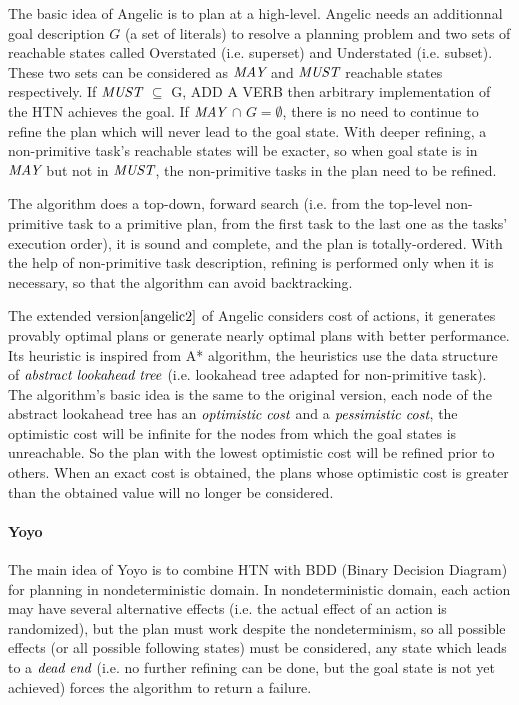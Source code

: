 The basic idea of Angelic \cite{angelic1} is to plan at a high-level. Angelic needs an additionnal goal description $G$ (a set of literals) to resolve a planning problem and two sets of reachable states called Overstated (i.e. superset) and Understated (i.e. subset). These two sets can be considered as $\emph{MAY}$ and $\emph{MUST}$ reachable states respectively. If $\emph{MUST}$ $\subseteq$ G, ADD A VERB then arbitrary implementation of the HTN achieves the goal. If $\emph{MAY}$ $\cap$ $G = \emptyset$, there is no need to continue to refine the plan which will never lead to the goal state. With deeper refining, a non-primitive task’s reachable states will be exacter, so when goal state is in $\emph{MAY}$ but not in $\emph{MUST}$, the non-primitive tasks in the plan need to be refined. 

The algorithm does a top-down, forward search (i.e. from the top-level non-primitive task to a primitive plan, from the first task to the last one as the tasks’ execution order), it is sound and complete, and the plan is totally-ordered. With the help of non-primitive task description, refining is performed only when it is necessary, so that the algorithm can avoid backtracking.

The extended version$\cite{angelic2}$ of Angelic considers cost of actions, it generates provably optimal plans or generate nearly optimal plans with better performance. Its heuristic is inspired from A* algorithm, the heuristics use the data structure of $\emph{abstract lookahead tree}$ (i.e. lookahead tree adapted for non-primitive task). The algorithm’s basic idea is the same to the original version, each node of the abstract lookahead tree has an $\emph{optimistic cost}$ and a $\emph{pessimistic cost}$, the optimistic cost will be infinite for the nodes from which the goal states is unreachable. So the plan with the lowest optimistic cost will be refined prior to others. When an exact cost is obtained, the plans whose optimistic cost is greater than the obtained value will no longer be considered.

\paragraph*{Yoyo}
The main idea of Yoyo\cite{yoyo} is to combine HTN with BDD (Binary Decision Diagram) for planning in nondeterministic domain. In nondeterministic domain, each action may have several alternative effects (i.e. the actual effect of an action is randomized), but the plan must work despite the nondeterminism, so all possible effects (or all possible following states) must be considered, any state which leads to a $\emph{dead end}$ (i.e. no further refining can be done, but the goal state is not yet achieved) forces the algorithm to return a failure. 

